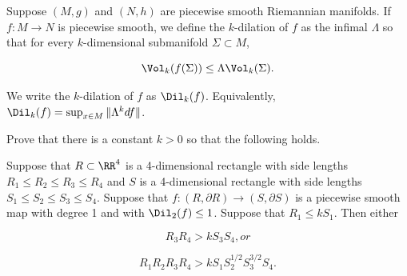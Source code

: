 Suppose $(M, g)$ and $(N,h)$ are piecewise smooth Riemannian manifolds.   If $f: M \rightarrow N$ is piecewise smooth,  we define the $k$-dilation of $f$ as the infimal $\Lambda$ so that for every $k$-dimensional submanifold $\Sigma \subset M$, 

$$ \Vol_k( f(\Sigma) ) \le \Lambda \Vol_k (\Sigma). $$

\noindent We write the $k$-dilation of $f$ as $\Dil_k(f)$.   Equivalently,  $\Dil_k(f) = \sup_{x \in M} \| \Lambda^k df \|$.

Prove that there is a constant $k > 0$ so that the following holds.

Suppose that $R \subset \RR^4$ is a 4-dimensional rectangle with side lengths $R_1 \le R_2 \le R_3 \le R_4$ and $S$ is a 4-dimensional rectangle with side lengths $S_1 \le S_2 \le S_3 \le S_4$.   Suppose that $f: (R, \partial R) \rightarrow (S, \partial S)$ is a piecewise smooth map with degree 1 and with $\Dil_2(f) \le 1$.   Suppose that $R_1 \le k S_1$.   Then either

$$ R_3 R_4 > k S_3 S_4,  or $$

$$ R_1 R_2 R_3 R_4 > k S_1 S_2^{1/2} S_3^{3/2} S_4. $$